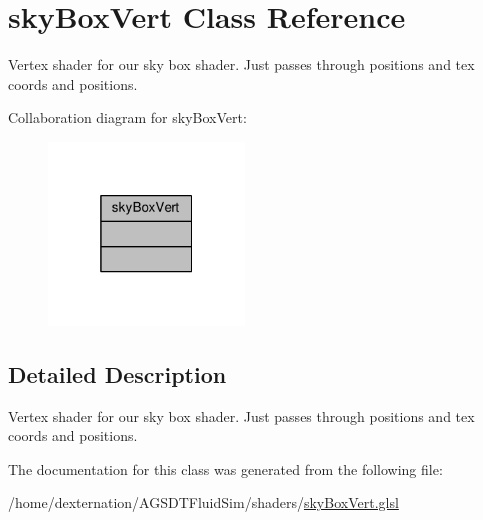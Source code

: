 \hypertarget{classsky_box_vert}{\section{sky\-Box\-Vert Class Reference}
\label{classsky_box_vert}
}


Vertex shader for our sky box shader. Just passes through positions and tex coords and positions.  




Collaboration diagram for sky\-Box\-Vert\-:\nopagebreak
\begin{figure}[H]
\begin{center}
\leavevmode
\includegraphics[width=148pt]{classsky_box_vert__coll__graph}
\end{center}
\end{figure}


\subsection{Detailed Description}
Vertex shader for our sky box shader. Just passes through positions and tex coords and positions. 

The documentation for this class was generated from the following file\-:\begin{DoxyCompactItemize}
\item 
/home/dexternation/\-A\-G\-S\-D\-T\-Fluid\-Sim/shaders/\hyperlink{sky_box_vert_8glsl}{sky\-Box\-Vert.\-glsl}\end{DoxyCompactItemize}
